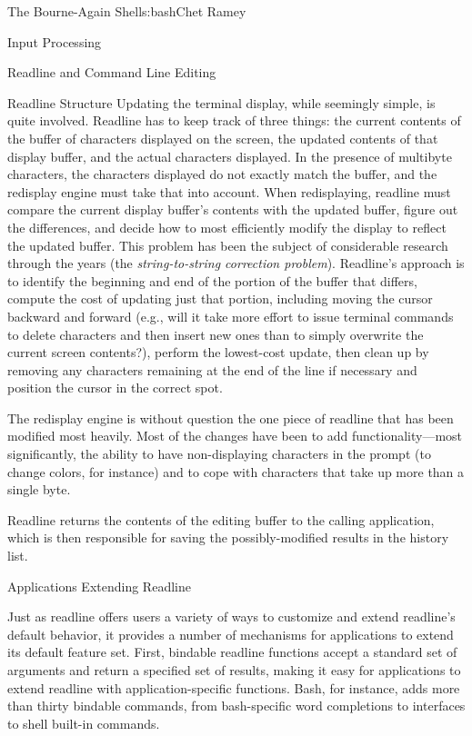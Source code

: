 \begin{aosachapter}{The Bourne-Again Shell}{s:bash}{Chet Ramey}
\begin{aosasect1}{Input Processing}
\begin{aosasect2}{Readline and Command Line Editing}
\begin{aosasect3}{Readline Structure}
Updating the terminal display, while seemingly simple, is quite
involved.  Readline has to keep track of three things: the current
contents of the buffer of characters displayed on the screen, the
updated contents of that display buffer, and the actual characters
displayed.  In the presence of multibyte characters, the characters
displayed do not exactly match the buffer, and the redisplay engine
must take that into account.  When redisplaying, readline must compare
the current display buffer's contents with the updated buffer, figure
out the differences, and decide how to most efficiently modify the
display to reflect the updated buffer.  This problem has been the
subject of considerable research through the years (the
\emph{string-to-string correction problem}).  Readline's approach is to
identify the beginning and end of the portion of the buffer that
differs, compute the cost of updating just that portion, including
moving the cursor backward and forward (e.g., will it take more effort
to issue terminal commands to delete characters and then insert new
ones than to simply overwrite the current screen contents?), perform
the lowest-cost update, then clean up by removing any characters
remaining at the end of the line if necessary and position the cursor
in the correct spot.

The redisplay engine is without question the one piece of readline
that has been modified most heavily.  Most of the changes have been to
add functionality---most significantly, the ability to have
non-displaying characters in the prompt (to change colors, for instance)
and to cope with characters
that take up more than a single byte.

Readline returns the contents of the editing buffer to the calling
application, which is then responsible for saving the
possibly-modified results in the history list.

\end{aosasect3}

\begin{aosasect3}{Applications Extending Readline}

Just as readline offers users a variety of ways to customize and
extend readline's default behavior, it provides a number of mechanisms
for applications to extend its default feature set.  First, bindable
readline functions accept a standard set of arguments and return a
specified set of results, making it easy for applications to extend
readline with application-specific functions.  Bash, for instance,
adds more than thirty bindable commands, from bash-specific word
completions to interfaces to shell built-in commands.


\end{aosasect3}
\end{aosasect2}
\end{aosasect1}
\end{aosachapter}

